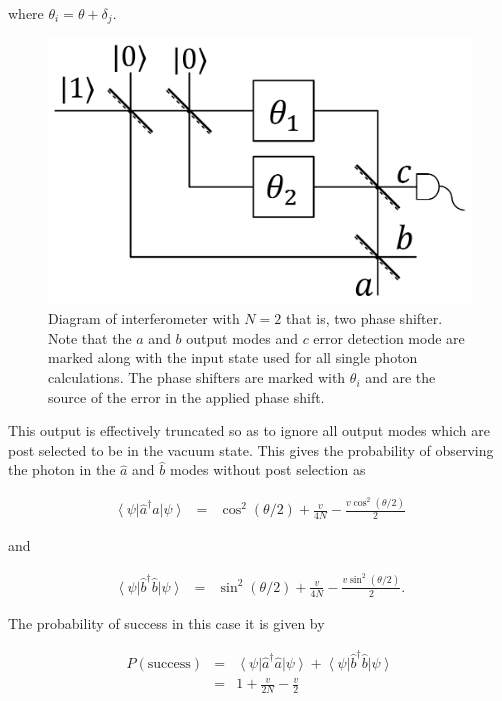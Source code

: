 \documentclass[aps,pra,twocolumn,superscriptaddress,numerical]{revtex4-1}
\begin{document}
		where $\theta_{i}=\theta+\delta_{j}$.
		\begin{figure}
			\includegraphics[width=\columnwidth]{2N1P.png}
			\caption{\label{fig:MZ_setup}Diagram of interferometer with $N=2$ that is, two phase shifter. Note that the $a$ and $b$ output modes and $c$ error detection mode are marked along with the input state used for all single photon calculations. The phase shifters are marked with $\theta_{i}$ and are the source of the error in the applied phase shift.}
		\end{figure}
		
		This output is effectively truncated so as to ignore all output modes which are post selected to be in the vacuum state. This gives the probability of observing the photon in the $\hat{a}$ and $\hat{b}$ modes without post selection as
		
		\begin{eqnarray}
			\left\langle \psi\right|\hat{a}^{\dagger}\hat{a}\left|\psi\right\rangle & = & \cos^{2}\left(\theta/2\right)+\frac{v}{4N}-\frac{v\cos^{2}(\theta/2)}{2}
		\end{eqnarray}
		
		
		and
		
		\begin{eqnarray}
			\left\langle \psi\right|\hat{b}^{\dagger}\hat{b}\left|\psi\right\rangle & = & \sin^{2}\left(\theta/2\right)+\frac{v}{4N}-\frac{v\sin^{2}(\theta/2)}{2}.
		\end{eqnarray}
		
		The probability of success in this case it is given by
		
		\begin{eqnarray}
			P(\textrm{success}) & = & \left\langle \psi\right|\hat{a}^{\dagger}\hat{a}\left|\psi\right\rangle +\left\langle \psi\right|\hat{b}^{\dagger}\hat{b}\left|\psi\right\rangle \\
			& = & 1+\frac{v}{2N}-\frac{v}{2} \label{eq:1pNarbitrary successs}
		\end{eqnarray}
		
\end{document}
